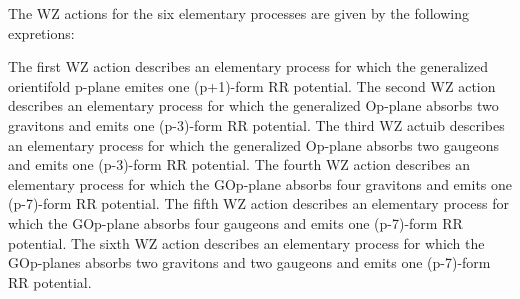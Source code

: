 \documentclass[a4paper,a4paper]{article}
\begin{document}
The WZ actions for the six elementary processes are given by the following 
expretions:
\begin{center}
{  \coordHE{} }
\end{center} 
\begin{center}
{  \coordHE{} }
\end{center}
\begin{center}
{  \coordHE{} }
\end{center}
\begin{center}
{  \coordHE{} }
\end{center}
\begin{center}
{  \coordHE{} }
\end{center}
\begin{center}
{  \coordHE{} }
\end{center}

The first WZ action describes an elementary process for which the generalized orientifold p-plane emites one (p+1)-form RR potential.
The second WZ action describes an elementary process for which the generalized
Op-plane absorbs two gravitons and emits one (p-3)-form RR potential.
The third WZ actuib describes an elementary process for which the generalized Op-plane absorbs two gaugeons and emits one (p-3)-form RR potential.
The fourth WZ action describes an elementary process for which the GOp-plane absorbs four gravitons and emits one (p-7)-form RR potential. 
The fifth WZ action describes an elementary process for which the GOp-plane absorbs four gaugeons and emits one (p-7)-form RR potential.
The sixth WZ action describes an elementary process for which the GOp-planes absorbs two gravitons and two gaugeons and emits one (p-7)-form RR potential.
\end{document}
